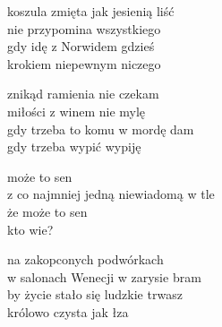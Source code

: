 \begin{text}
    koszula zmięta jak jesienią liść\\
    nie przypomina wszystkiego\\
    gdy idę z Norwidem gdzieś\\
    krokiem niepewnym niczego

    znikąd ramienia nie czekam\\
    miłości z winem nie mylę\\
    gdy trzeba to komu w mordę dam\\
    gdy trzeba wypić wypiję

    może to sen\\
    z co najmniej jedną niewiadomą w tle\\
    że może to sen\\
    kto wie?

    na zakopconych podwórkach\\
    w salonach Wenecji w zarysie bram\\
    by życie stało się ludzkie trwasz\\
    królowo czysta jak łza
\end{text}
\begin{chord}

\end{chord}
